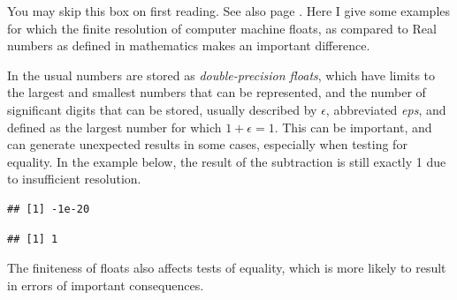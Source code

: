 \documentclass[krantz2]{krantz}\usepackage{knitr}%
\begin{document}
\begin{explainbox}
\label{box:floats} \label{par:float}
%
You may skip this box on first reading. See also page \pageref{par:float}. Here I give some examples for which the finite resolution of computer machine floats, as compared to Real numbers as defined in mathematics makes an important difference.

In \Rpgrm the usual numbers are stored as \emph{double-precision floats}, which have limits to the largest and smallest numbers that can be represented, and the number of significant digits that can be stored, usually described by $\epsilon$, abbreviated \emph{eps}, and defined as the largest number for which $1 + \epsilon = 1$. This can be important, and can generate unexpected results in some cases, especially when testing for equality. In the example below, the result of the subtraction is still exactly 1 due to insufficient resolution.

\begin{knitrout}\footnotesize
{}\color{fgcolor}\begin{kframe}
\begin{alltt}
 \hlopt{-} 
\end{alltt}
\begin{verbatim}
## [1] -1e-20
\end{verbatim}
\begin{alltt}
 \hlopt{-} 
\end{alltt}
\begin{verbatim}
## [1] 1
\end{verbatim}
\end{kframe}
\end{knitrout}

The finiteness of floats also affects tests of equality, which is more likely to result in errors of important consequences.


\end{explainbox}
\end{document}
